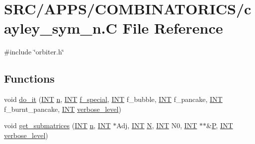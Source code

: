 \hypertarget{cayley__sym__n_8_c}{}\section{S\+R\+C/\+A\+P\+P\+S/\+C\+O\+M\+B\+I\+N\+A\+T\+O\+R\+I\+C\+S/cayley\+\_\+sym\+\_\+n.C File Reference}
\label{cayley__sym__n_8_c}
{\ttfamily \#include \char`\"{}orbiter.\+h\char`\"{}}\newline
\subsection*{Functions}
\begin{DoxyCompactItemize}
\item 
void \mbox{\hyperlink{cayley__sym__n_8_c_ab4f43aff64e4371cbd0499ed0a5e76d2}{do\+\_\+it}} (\mbox{\hyperlink{galois_8h_a09fddde158a3a20bd2dcadb609de11dc}{I\+NT}} \mbox{\hyperlink{simeon_8_c_a7f2cd26777ce0ff3fdaf8d02aacbddfb}{n}}, \mbox{\hyperlink{galois_8h_a09fddde158a3a20bd2dcadb609de11dc}{I\+NT}} \mbox{\hyperlink{simeon_8_c_a5c9bb19da4c942e41c1d5cfc81f4cfd7}{f\+\_\+special}}, \mbox{\hyperlink{galois_8h_a09fddde158a3a20bd2dcadb609de11dc}{I\+NT}} f\+\_\+bubble, \mbox{\hyperlink{galois_8h_a09fddde158a3a20bd2dcadb609de11dc}{I\+NT}} f\+\_\+pancake, \mbox{\hyperlink{galois_8h_a09fddde158a3a20bd2dcadb609de11dc}{I\+NT}} f\+\_\+burnt\+\_\+pancake, \mbox{\hyperlink{galois_8h_a09fddde158a3a20bd2dcadb609de11dc}{I\+NT}} \mbox{\hyperlink{simeon_8_c_a818073fbcc2f439e7c56952f67386122}{verbose\+\_\+level}})
\item 
void \mbox{\hyperlink{cayley__sym__n_8_c_a8303307ece8025222bb8059632c00b24}{get\+\_\+submatrices}} (\mbox{\hyperlink{galois_8h_a09fddde158a3a20bd2dcadb609de11dc}{I\+NT}} \mbox{\hyperlink{simeon_8_c_a7f2cd26777ce0ff3fdaf8d02aacbddfb}{n}}, \mbox{\hyperlink{galois_8h_a09fddde158a3a20bd2dcadb609de11dc}{I\+NT}} $\ast$Adj, \mbox{\hyperlink{galois_8h_a09fddde158a3a20bd2dcadb609de11dc}{I\+NT}} \mbox{\hyperlink{_a_p_p_s_2_t_d_o_2packing_8_c_a0240ac851181b84ac374872dc5434ee4}{N}}, \mbox{\hyperlink{galois_8h_a09fddde158a3a20bd2dcadb609de11dc}{I\+NT}} N0, \mbox{\hyperlink{galois_8h_a09fddde158a3a20bd2dcadb609de11dc}{I\+NT}} $\ast$$\ast$\&\mbox{\hyperlink{simeon_8_c_a7fa15551e800919e93401fbbcd8e71e8}{P}}, \mbox{\hyperlink{galois_8h_a09fddde158a3a20bd2dcadb609de11dc}{I\+NT}} \mbox{\hyperlink{simeon_8_c_a818073fbcc2f439e7c56952f67386122}{verbose\+\_\+level}})
$$
\end{DoxyCompactItemize}

